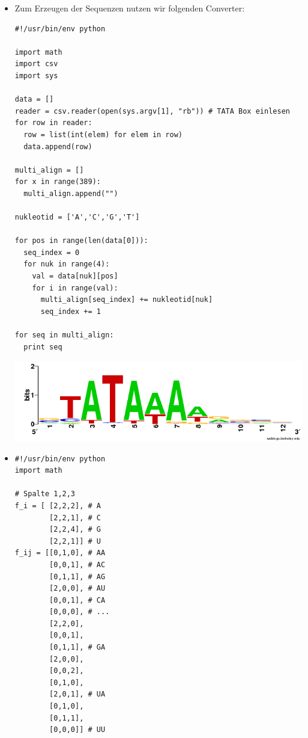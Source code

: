 \documentclass{homework}
\begin{document}
\begin{enumerate}
\begin{itemize}
\begin{verbatim}
  total = []
  for i in range(len(data)):
  	total.append(sum(data[i]))

  for k in range(len(data[0])):
  	entropy_k = 0
  	for x in range(len(data)):
  		p_x = float(data[x][k])/float(total[x])
    	if p_x > 0.0:
      		entropy_k += - p_x*math.log(p_x, 2)
  	entropy.append(entropy_k)  	
  return entropy
\end{verbatim}	
Entropie an den einzelnen Stellen:
[0.12184801315067625, 0.4813339454925309, 0.13318690772179287, 0.5089006190074657, 0.11893257617525575, 0.3055540303148797, 0.03375187186546901, 0.3055540303148797, 0.12758004245962837, 0.16701068307825856, 0.12184801315067625, 0.17663295008310864, 0.19715528596320855, 0.22641255122744397, 0.21835301025523862]

Gesamtentropie: 3.24405453026

	\item
Zum Erzeugen der Sequenzen nutzen wir folgenden Converter:
\begin{verbatim}
#!/usr/bin/env python

import math
import csv
import sys

data = []
reader = csv.reader(open(sys.argv[1], "rb")) # TATA Box einlesen
for row in reader:
  row = list(int(elem) for elem in row)
  data.append(row)
  
multi_align = []
for x in range(389):
  multi_align.append("")

nukleotid = ['A','C','G','T']

for pos in range(len(data[0])):
  seq_index = 0
  for nuk in range(4): 
    val = data[nuk][pos]
    for i in range(val):
      multi_align[seq_index] += nukleotid[nuk]
      seq_index += 1
      
for seq in multi_align:
  print seq
\end{verbatim}

\includegraphics[scale=0.6]{../data/u8_aufg28b}
	\item
\begin{verbatim}
#!/usr/bin/env python
import math

# Spalte 1,2,3
f_i = [	[2,2,2], # A
        [2,2,1], # C
        [2,2,4], # G
        [2,2,1]] # U
f_ij = [[0,1,0], # AA
        [0,0,1], # AC
        [0,1,1], # AG
        [2,0,0], # AU
        [0,0,1], # CA
        [0,0,0], # ...
        [2,2,0],
        [0,0,1],
        [0,1,1], # GA
        [2,0,0],
        [0,0,2],
        [0,1,0],
        [2,0,1], # UA
        [0,1,0],
        [0,1,1],
        [0,0,0]] # UU


\end{verbatim}
\end{itemize}
\end{enumerate}
\end{document}
